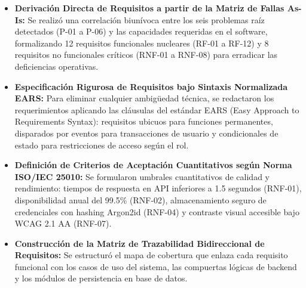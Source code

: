 \documentclass[12pt,a4paper]{article}
\begin{document}
\begin{itemize}[leftmargin=1.5em, itemsep=4pt]
    \item \textbf{Derivación Directa de Requisitos a partir de la Matriz de Fallas As-Is:} Se realizó una correlación biunívoca entre los seis problemas raíz detectados (P-01 a P-06) y las capacidades requeridas en el software, formalizando 12 requisitos funcionales nucleares (RF-01 a RF-12) y 8 requisitos no funcionales críticos (RNF-01 a RNF-08) para erradicar las deficiencias operativas.
    \item \textbf{Especificación Rigurosa de Requisitos bajo Sintaxis Normalizada EARS:} Para eliminar cualquier ambigüedad técnica, se redactaron los requerimientos aplicando las cláusulas del estándar EARS (Easy Approach to Requirements Syntax): requisitos ubicuos para funciones permanentes, disparados por eventos para transacciones de usuario y condicionales de estado para restricciones de acceso según el rol.
    \item \textbf{Definición de Criterios de Aceptación Cuantitativos según Norma ISO/IEC 25010:} Se formularon umbrales cuantitativos de calidad y rendimiento: tiempos de respuesta en API inferiores a 1.5 segundos (RNF-01), disponibilidad anual del 99.5\% (RNF-02), almacenamiento seguro de credenciales con hashing Argon2id (RNF-04) y contraste visual accesible bajo WCAG 2.1 AA (RNF-07).
    \item \textbf{Construcción de la Matriz de Trazabilidad Bidireccional de Requisitos:} Se estructuró el mapa de cobertura que enlaza cada requisito funcional con los casos de uso del sistema, las compuertas lógicas de backend y los módulos de persistencia en base de datos.
\end{itemize}
\end{document}
